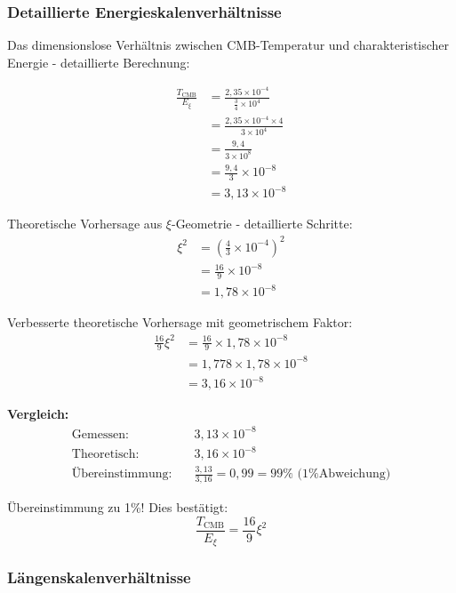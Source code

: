 	\subsubsection{Detaillierte Energieskalenverhältnisse}
	
	Das dimensionslose Verhältnis zwischen CMB-Temperatur und charakteristischer Energie - detaillierte Berechnung:
	
	\begin{align}
		\frac{T_{\text{CMB}}}{E_\xi} &= \frac{2,35 \times 10^{-4}}{\frac{3}{4} \times 10^4} \\
		&= \frac{2,35 \times 10^{-4} \times 4}{3 \times 10^4} \\
		&= \frac{9,4}{3 \times 10^8} \\
		&= \frac{9,4}{3} \times 10^{-8} \\
		&= 3,13 \times 10^{-8}
	\end{align}
	
	Theoretische Vorhersage aus $\xi$-Geometrie - detaillierte Schritte:
	\begin{align}
		\xi^2 &= \left(\frac{4}{3} \times 10^{-4}\right)^2 \\
		&= \frac{16}{9} \times 10^{-8} \\
		&= 1,78 \times 10^{-8}
	\end{align}
	
	Verbesserte theoretische Vorhersage mit geometrischem Faktor:
	\begin{align}
		\frac{16}{9}\xi^2 &= \frac{16}{9} \times 1,78 \times 10^{-8} \\
		&= 1,778 \times 1,78 \times 10^{-8} \\
		&= 3,16 \times 10^{-8}
	\end{align}
	
	\textbf{Vergleich:}
	\begin{align}
		\text{Gemessen:} \quad &3,13 \times 10^{-8} \\
		\text{Theoretisch:} \quad &3,16 \times 10^{-8} \\
		\text{Übereinstimmung:} \quad &\frac{3,13}{3,16} = 0,99 = 99\% \text{ (1\% Abweichung)}
	\end{align}
	
	Übereinstimmung zu 1\%! Dies bestätigt:
	\begin{equation}
		\boxed{\frac{T_{\text{CMB}}}{E_\xi} = \frac{16}{9}\xi^2}
	\end{equation}
	
	\subsubsection{Längenskalenverhältnisse}
	
